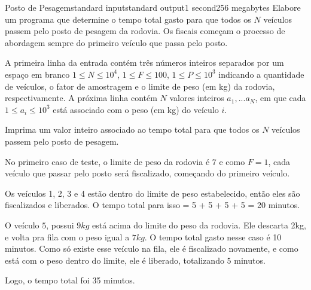 \begin{problem}{Posto de Pesagem}{standard input}{standard output}{1 second}{256 megabytes}
Elabore um programa que determine o tempo total gasto para que todos os $N$ veículos passem pelo posto de pesagem da rodovia. Os fiscais começam o processo de abordagem sempre do primeiro veículo que passa pelo posto.

\InputFile
A primeira linha da entrada contém três números inteiros separados por um espaço em branco $1 \leq N \leq 10^4$, $1 \leq F \leq 100$, $1 \leq P \leq 10^3$ indicando a quantidade de veículos, o fator de amostragem e o limite de peso (em kg) da rodovia, respectivamente. A próxima linha contém $N$ valores inteiros $a_1,...a_N$, em que cada $1 \leq a_i \leq 10^3$ está associado com o peso (em kg) do veículo $i$. 

\OutputFile
Imprima um valor inteiro associado ao tempo total para que todos os $N$ veículos passem pelo posto de pesagem.

\Examples

\begin{example}
%
%
%
%
\end{example}

\Note
No primeiro caso de teste, o limite de peso da rodovia é $7$ e como $F=1$, cada veículo que passar pelo posto será fiscalizado, começando do primeiro veículo.

Os veículos 1, 2, 3 e 4 estão dentro do limite de peso estabelecido, então eles são fiscalizados e liberados. O tempo total para isso = 5 + 5 + 5 + 5 = 20 minutos.

O veículo $5$, possui $9kg$ está acima do limite do peso da rodovia. Ele descarta 2kg, e volta pra fila com o peso igual a $7kg$. O tempo total gasto nesse caso é 10 minutos. Como só existe esse veículo na fila, ele é fiscalizado novamente, e como está com o peso dentro do limite, ele é liberado, totalizando $5$ minutos.

Logo, o tempo total foi 35 minutos.



\end{problem}

